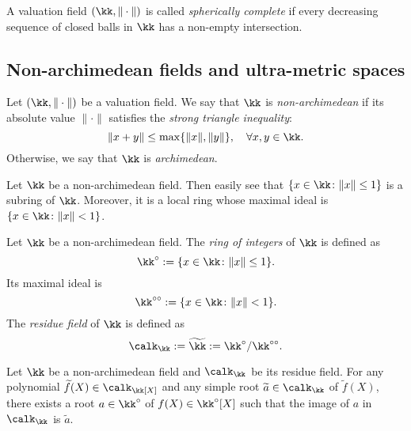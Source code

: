     \begin{definition}\label{def:spherically_complete}
        A valuation field \((\kk,\|\cdot\|)\) is called \emph{spherically complete} if every decreasing sequence of closed balls in \(\kk\) has a non-empty intersection.
    \end{definition}

\subsection{Non-archimedean fields and ultra-metric spaces}

    \begin{definition}\label{def:non-archimedean_fields}
        Let \((\kk,\|\cdot\|)\) be a valuation field.
        We say that \(\kk\) is \emph{non-archimedean} if its absolute value \(\|\cdot\|\) satisfies the \emph{strong triangle inequality}:
        \[ \|x+y\|\leq\max\{\|x\|,\|y\|\},\quad\forall x,y\in\kk. \]
        Otherwise, we say that \(\kk\) is \emph{archimedean}.
    \end{definition}

    Let \(\kk\) be a non-archimedean field.
    Then easily see that \(\{x \in \kk\colon \|x\|\leq 1\}\) is a subring of \(\kk\).
    Moreover, it is a local ring whose maximal ideal is \(\{x \in \kk\colon \|x\| < 1\}\).

    \begin{definition}\label{def:non-archimedean_field_ring_of_integers_maximal_ideal_and_residue_field}
        Let \(\kk\) be a non-archimedean field.
        The \emph{ring of integers} of \(\kk\) is defined as
        \[ \kk^\circ := \{x \in \kk\colon \|x\|\leq 1\}. \]
        Its maximal ideal is
        \[ \kk^{\circ\circ} := \{x \in \kk\colon \|x\| < 1\}. \]
        The \emph{residue field} of \(\kk\) is defined as
        \[ \calk_\kk := \widetilde{\kk} := \kk^\circ / \kk^{\circ\circ}. \]
    \end{definition}


    \begin{theorem}\label{thm:Hessel_lemma}
        Let \(\kk\) be a non-archimedean field and \(\calk_\kk\) be its residue field.
        For any polynomial \(\widetilde{f}(X) \in \calk_\kk[X]\) and any simple root \(\widetilde{a} \in \calk_\kk\) of \(\widetilde{f}(X)\), there exists a root \(a \in \kk^\circ\) of \(f(X) \in \kk^\circ[X]\) such that the image of \(a\) in \(\calk_\kk\) is \(\widetilde{a}\).
    \end{theorem}

